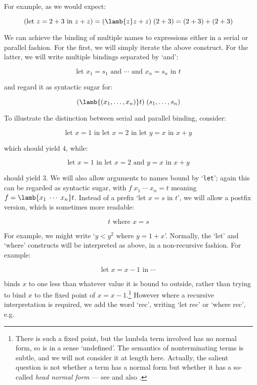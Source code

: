 \noindent For example, as we would expect:

$$ (\mbox{let } z = 2 + 3 \mbox{ in } z + z) = (\lamb{z} z + z)\; (2 + 3) =
   (2 + 3) + (2 + 3) $$

We can achieve the binding of multiple names to expressions either in a serial
or parallel fashion. For the first, we will simply iterate the above construct.
For the latter, we will write multiple bindings separated by `and':

$$ \mbox{let } x_1 = s_1 \mbox{ and } \cdots \mbox{ and } x_n = s_n
     \mbox{ in } t $$

\noindent and regard it as syntactic sugar for:

$$ (\lamb{(x_1,\ldots,x_n)} t)\; (s_1,\ldots,s_n) $$

\noindent To illustrate the distinction between serial and parallel binding,
consider:

$$ \mbox{let } x = 1 \mbox{ in }
   \mbox{let } x = 2 \mbox{ in }
   \mbox{let } y = x \mbox{ in } x + y $$

\noindent which should yield $4$, while:

$$ \mbox{let } x = 1 \mbox{ in }
   \mbox{let } x = 2
   \mbox{ and } y = x \mbox{ in } x + y $$

\noindent should yield $3$. We will also allow arguments to names bound by
`{\tt let}'; again this can be regarded as syntactic sugar, with $f\; x_1\;
\cdots \; x_n = t$ meaning $f = \lamb{x_1\; \cdots \; x_n} t$. Instead of a
prefix `$\mbox{let } x = s \mbox{ in } t$', we will allow a postfix version,
which is sometimes more readable:

$$ t \mbox{ where } x = s $$

For example, we might write `$y < y^2 \mbox{ where } y = 1 + x$'. Normally, the
`let' and `where' constructs will be interpreted as above, in a non-recursive
fashion. For example:

$$ \mbox{let } x = x - 1 \mbox{ in } \cdots $$

\noindent binds $x$ to one less than whatever value it is bound to outside,
rather than trying to bind $x$ to the fixed point of $x = x -
1$.\footnote{There is such a fixed point, but the lambda term involved has no
normal form, so is in a sense `undefined'. The semantics of nonterminating
terms is subtle, and we will not consider it at length here. Actually, the
salient question is not whether a term has a normal form but whether it has a
so-called {\em head normal form} --- see  and also
.} However where a recursive interpretation is required,
we add the word `rec', writing `let rec' or `where rec', e.g.

